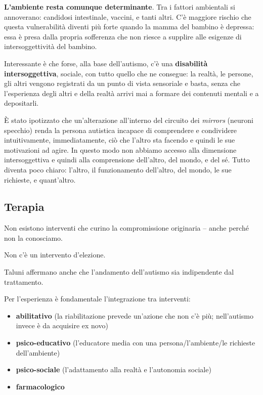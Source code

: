 \textbf{L'ambiente resta comunque determinante}. Tra i fattori
ambientali si annoverano: candidosi intestinale, vaccini, e tanti altri.
C'è maggiore rischio che questa vulnerabilità diventi più forte quando
la mamma del bambino è depressa: essa è presa dalla propria sofferenza
che non riesce a supplire alle esigenze di intersoggettività del
bambino.

Interessante è che forse, alla base dell'autismo, c'è una
\textbf{disabilità intersoggettiva}, sociale, con tutto quello che ne
consegue: la realtà, le persone, gli altri vengono registrati da un
punto di vista sensoriale e basta, senza che l'esperienza degli altri e
della realtà arrivi mai a formare dei contenuti mentali e a depositarli.

È stato ipotizzato che un'alterazione all'interno del circuito dei
\emph{mirrors} (neuroni specchio) renda la persona autistica incapace di
comprendere e condividere intuitivamente, immediatamente, ciò che
l'altro sta facendo e quindi le sue motivazioni ad agire. In questo modo
non abbiamo accesso alla dimensione intersoggettiva e quindi alla
comprensione dell'altro, del mondo, e del sé. Tutto diventa poco chiaro:
l'altro, il funzionamento dell'altro, del mondo, le sue richieste, e
quant'altro.

\subsection{Terapia}

Non esistono interventi che curino la compromissione originaria -- anche
perché non la conosciamo.

Non c'è un intervento d'elezione.

Taluni affermano anche che l'andamento dell'autismo sia indipendente dal
trattamento.

Per l'esperienza è fondamentale l'integrazione tra interventi:

\begin{itemize}
\item
  \textbf{abilitativo} (la riabilitazione prevede un'azione che non c'è
  più; nell'autismo invece è da acquisire ex novo)
\item
  \textbf{psico-educativo} (l'educatore media con una
  persona/l'ambiente/le richieste dell'ambiente)
\item
  \textbf{psico-sociale} (l'adattamento alla realtà e l'autonomia
  sociale)
\item
  \textbf{farmacologico}
\end{itemize}

